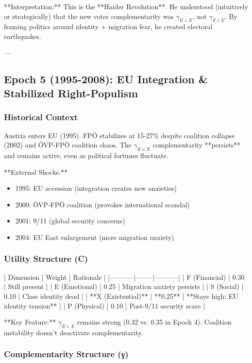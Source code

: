 **Interpretation:** This is the **Haider Revolution**. He understood (intuitively or strategically) that the new voter complementarity was $\gamma_{E \times X}$, not $\gamma_{F \times E}$. By framing politics around identity + migration fear, he created electoral earthquakes.

---

\subsection{Epoch 5 (1995-2008): EU Integration \& Stabilized Right-Populism}

\subsubsection{Historical Context}

Austria enters EU (1995). FPÖ stabilizes at 15-27\% despite coalition collapse (2002) and ÖVP-FPÖ coalition chaos. The $\gamma_{E \times X}$ complementarity **persists** and remains active, even as political fortunes fluctuate.

**External Shocks:**
\begin{itemize}
\item 1995: EU accession (integration creates new anxieties)
\item 2000: ÖVP-FPÖ coalition (provokes international scandal)
\item 2001: 9/11 (global security concerns)
\item 2004: EU East enlargement (more migration anxiety)
\end{itemize}

\subsubsection{Utility Structure (C)}

| Dimension | Weight | Rationale |
|-----------|--------|-----------|
| F (Financial) | 0.30 | Still present |
| E (Emotional) | 0.25 | Migration anxiety persists |
| S (Social) | 0.10 | Class identity dead |
| **X (Existential)** | **0.25** | **Stays high: EU identity tension** |
| P (Physical) | 0.10 | Post-9/11 security scare |

**Key Feature:** $\gamma_{E \times X}$ remains strong (0.32 vs. 0.35 in Epoch 4). Coalition instability doesn't deactivate complementarity.

\subsubsection{Complementarity Structure (γ)}

